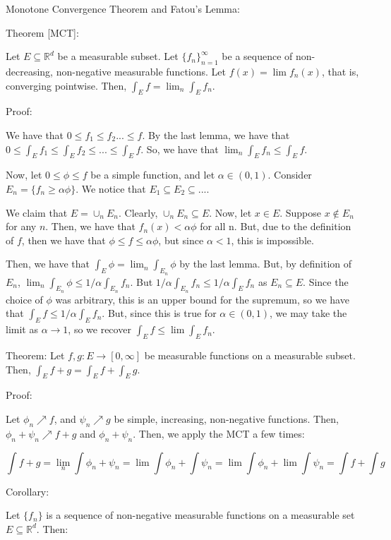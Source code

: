 \documentclass[10pt]{article}
\begin{document}
Monotone Convergence Theorem and Fatou’s Lemma:

Theorem [MCT]:

Let $E \subseteq \mathbb{R}^d$ be a measurable subset. Let $\{ f_n \}_{n=1}^\infty$ be a sequence of non-decreasing, non-negative measurable functions. Let $f(x) = \lim f_n(x)$, that is, converging pointwise. Then, $\int_E f = \lim_n \int_E f_n$.

Proof:

We have that $0 \leq f_1 \leq f_2 ... \leq f$. By the last lemma, we have that $0 \leq \int_E f_1 \leq \int_E f_2 \leq ... \leq \int_E f$. So, we have that $\lim_n \int_E f_n \leq \int_E f$. 

Now, let $0 \leq \phi \leq f$ be a simple function, and let $\alpha \in (0,1)$. Consider $E_n = \{ f_n \geq \alpha \phi \}$. We notice that $E_1 \subseteq E_2 \subseteq ...$.

We claim that $E = \cup_n E_n$. Clearly, $\cup_n E_n \subseteq E$. Now, let $x \in E$. Suppose $x \not \in E_n$ for any $n$. Then, we have that $f_n(x) < \alpha \phi$ for all n. But, due to the definition of $f$, then we have that $\phi \leq f \leq \alpha \phi$, but since $\alpha < 1$, this is impossible.

Then, we have that $\int_E \phi = \lim_n \int_{E_n} \phi$ by the last lemma. But, by definition of $E_n$, $ \lim_n \int_{E_n} \phi \leq 1/\alpha \int_{E_n} f_n$. But $ 1/\alpha \int_{E_n} f_n \leq 1/\alpha \int_E f_n$ as $E_n \subseteq E$. Since the choice of $\phi$ was arbitrary, this is an upper bound for the supremum, so we have that $\int_E f \leq 1/\alpha \int_E f_n$. But, since this is true for $\alpha \in (0,1)$, we may take the limit as $\alpha \to 1$, so we recover $\int_E f \leq \lim \int_E f_n$.

Theorem: Let $f,g: E \to [0,\infty]$ be measurable functions on a measurable subset. Then, $\int_E f + g = \int_E f + \int_E g$.

Proof:

Let $\phi_n \nearrow f$, and $\psi_n \nearrow g$ be simple, increasing, non-negative functions. Then, $\phi_n + \psi_n \nearrow f+g$ and $\phi_n + \psi_n$. Then, we apply the MCT a few times:

$$ \int f+g = \lim_n \int \phi_n + \psi_n = \lim \int \phi_n + \int \psi_n = \lim \int \phi_n + \lim \int \psi_n = \int f + \int g$$

Corollary:

Let $\{ f_n \}$ is a sequence of non-negative measurable functions on a measurable set $E \subseteq \mathbb{R}^d$. Then:
\end{document}
